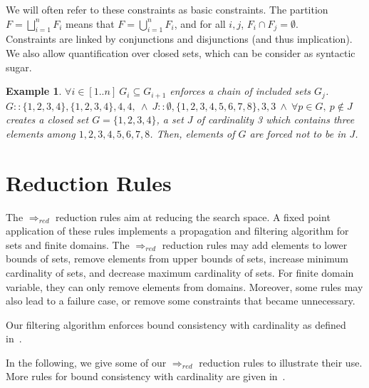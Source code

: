 \documentclass[3p,authoryear,times]{elsarticle}
\newtheorem{example}{Example}[section]
\newcommand{\rmin}[0]{{\Rightarrow_{red}}}
\begin{document}
\color{black}

We will often refer to these constraints as basic constraints.
The partition $F = \bigsqcup_{i=1}^{n}F_i$ means that $F = \bigcup_{i=1}^{n}F_i$, and for all $i,j$, $F_i \cap F_j =\emptyset$. \\

Constraints are linked by conjunctions and disjunctions (and thus implication). We also allow quantification over closed sets, which can be consider as syntactic sugar.

\begin{example}
$\forall i \in [1..n]~ G_i \subseteq G_{i+1}$ enforces a chain of included sets $G_j$.\\
$G::\{1,2,3,4\},\{1,2,3,4\},4,4, ~\wedge~ J::\emptyset,\{1,2,3,4,5,6,7,8\},3,3 ~\wedge~ \forall p \in G,~p \not \in J$ creates a closed set $G=\{1,2,3,4\}$, a set $J$ of cardinality 3 which contains three elements among $1,2,3,4,5,6,7,8$. Then, elements of $G$ are forced not to be in $J$.
\end{example}
\color{red}
\section{Reduction Rules}
\label{sec:reduc}

The $\rmin$ reduction rules  aim at reducing the search space. A fixed point application of these rules implements a propagation and filtering algorithm for sets and finite domains. The $\rmin$ reduction rules  may add elements to lower bounds of sets, remove elements from  upper bounds of sets, increase minimum cardinality of sets, and decrease maximum cardinality of sets. For finite domain variable, they can only remove elements from domains. Moreover, some rules may also lead to a failure case, or remove some constraints that became unnecessary.

Our filtering algorithm enforces bound consistency with cardinality as defined in~\cite{azevedoThesis, azevedoConstraint07}.



In the following, we give some of our $\rmin$ reduction rules to illustrate their use. More rules for bound consistency with cardinality are given in~\cite{azevedoThesis}.
\end{document}
